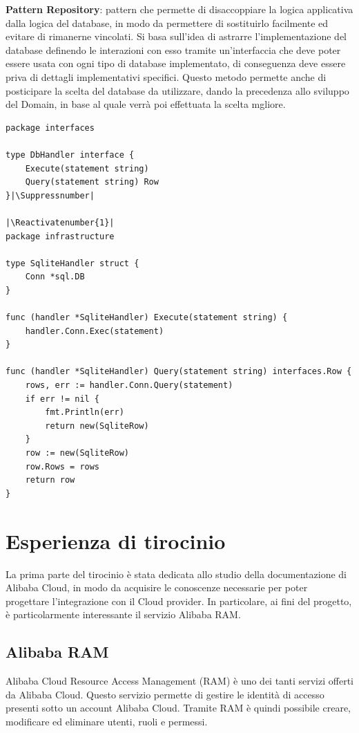 \documentclass[a4paper]{article}
\makeatletter
\let\origthelstnumber\thelstnumber
\newcommand*\Suppressnumber{%
  \lst@AddToHook{OnNewLine}{%
    \let\thelstnumber\relax%
     \advance\c@lstnumber-\@ne\relax%
    }%
}
\newcommand*\Reactivatenumber[1]{%
  \setcounter{lstnumber}{\numexpr#1-1\relax}
  \lst@AddToHook{OnNewLine}{%
   \let\thelstnumber\origthelstnumber%
   \refstepcounter{lstnumber}
  }%
}
\makeatother
\begin{document}
\textbf{Pattern Repository}: pattern che permette di disaccoppiare la logica applicativa dalla logica del database, in modo da permettere di sostituirlo facilmente ed evitare di rimanerne vincolati. Si basa sull'idea di astrarre l'implementazione del database definendo le interazioni con esso tramite un'interfaccia che deve poter essere usata con ogni tipo di database implementato, di conseguenza deve essere priva di dettagli implementativi specifici. Questo metodo permette anche di posticipare la scelta del database da utilizzare, dando la precedenza allo sviluppo del Domain, in base al quale verrà poi effettuata la scelta mgliore.\cite{go_with_domain}

\begin{lstlisting}[style=customgo, caption=esempio di implementazione del pattern Repository, captionpos=b]
package interfaces

type DbHandler interface {
    Execute(statement string)
    Query(statement string) Row
}|\Suppressnumber|

|\Reactivatenumber{1}|
package infrastructure

type SqliteHandler struct {
    Conn *sql.DB
}

func (handler *SqliteHandler) Execute(statement string) {
    handler.Conn.Exec(statement)
}

func (handler *SqliteHandler) Query(statement string) interfaces.Row {
    rows, err := handler.Conn.Query(statement)
    if err != nil {
    	fmt.Println(err)
	    return new(SqliteRow)
	}
    row := new(SqliteRow)
    row.Rows = rows
    return row
}
\end{lstlisting}

\newpage
\section{Esperienza di tirocinio}
La prima parte del tirocinio è stata dedicata allo studio della documentazione di Alibaba Cloud, in modo da acquisire le conoscenze necessarie per poter progettare l'integrazione con il Cloud provider. In particolare, ai fini del progetto, è particolarmente interessante il servizio Alibaba RAM.
\subsection{Alibaba RAM}
Alibaba Cloud Resource Access Management (RAM) è uno dei tanti servizi offerti da Alibaba Cloud. Questo servizio permette di gestire le identità di accesso presenti sotto un account Alibaba Cloud. Tramite RAM è quindi possibile creare, modificare ed eliminare utenti, ruoli e permessi.\cite{alibaba_ram}
\end{document}
